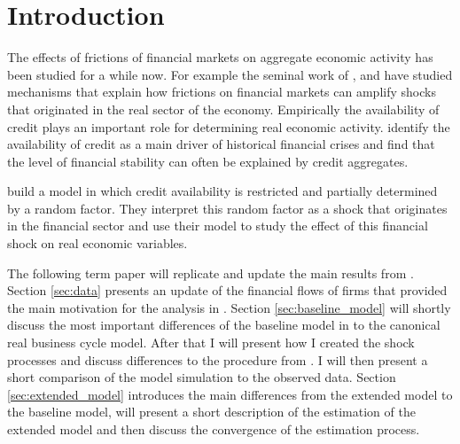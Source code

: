 
\section{Introduction}
\label{sec:introduction}

The effects of frictions of financial markets on aggregate economic activity
has been studied for a while now. For example the seminal work of
\textcite{kiyotaki_credit_1997}, \textcite{bernanke_agency_1989} and
\textcite{bernanke_financial_1999} have studied mechanisms that explain how
frictions on financial markets can amplify shocks that originated in the real
sector of the economy. Empirically the availability of credit plays an
important role for determining real economic
activity. \textcite{kindleberger_manias_2011} identify the availability of
credit as a main driver of historical financial crises and
\textcite{schularick_credit_2012} find that the level of financial stability
can often be explained by credit aggregates.

\textcite{jerman_macroeconomic_2012} build a model in which credit availability
is restricted and partially determined by a random factor. They interpret this
random factor as a shock that originates in the financial sector and use their
model to study the effect of this financial shock on real economic variables.

The following term paper will replicate and update the main results from
\textcite{jerman_macroeconomic_2012}. Section \ref{sec:data} presents an update
of the financial flows of firms that provided the main motivation for the
analysis in \textcite{jerman_macroeconomic_2012}. Section
\ref{sec:baseline_model} will shortly discuss the most important differences of
the baseline model in \textcite{jerman_macroeconomic_2012} to the canonical
real business cycle model. After that I will present how I created the shock
processes and discuss differences to the procedure from
\citeauthor{jerman_macroeconomic_2012}. I will then present a short comparison
of the model simulation to the observed data. Section \ref{sec:extended_model}
introduces the main differences from the extended model to the baseline model,
will present a short description of the estimation of the extended model and
then discuss the convergence of the estimation process.